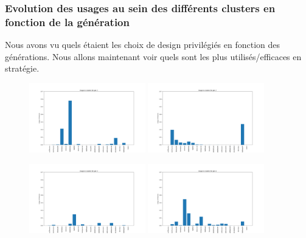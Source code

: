 \documentclass[a4paper,12pt]{article}
\begin{document}
\subsubsection{Evolution des usages au sein des différents clusters en fonction de la génération}

Nous avons vu quels étaient les choix de design privilégiés en fonction des
générations. Nous allons maintenant voir quels sont les plus utilisés/efficaces
en stratégie.

\begin{figure}[!h]
    \centering

    \includegraphics[width=0.45\textwidth]{Clustering/usage_gen/gen1.png}
    \includegraphics[width=0.45\textwidth]{Clustering/usage_gen/gen2.png}
    

    \vspace{1em}  %

    \includegraphics[width=0.45\textwidth]{Clustering/usage_gen/gen3.png}
    \includegraphics[width=0.45\textwidth]{Clustering/usage_gen/gen4.png}
    


\end{figure}
\end{document}

